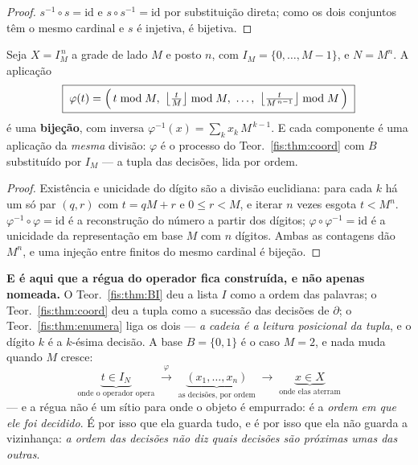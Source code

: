 \documentclass[livro.tex]{subfiles}
\begin{document}
\begin{proof}
$s^{-1}\circ s=\mathrm{id}$ e $s\circ s^{-1}=\mathrm{id}$ por substituição
direta; como os dois conjuntos têm o mesmo cardinal e $s$ é injetiva, é bijetiva.
\end{proof}

\begin{teorema}\label{fis:thm:enumera}
Seja $X=I_M^{\,n}$ a grade de lado $M$ e posto $n$, com $I_M=\{0,\dots,M-1\}$, e
$N=M^{n}$. A aplicação
\[
\boxed{\;\varphi(t)=\Bigl(\,t\bmod M,\ \bigl\lfloor\tfrac{t}{M}\bigr\rfloor\bmod M,\ \dots,\
\bigl\lfloor\tfrac{t}{M^{\,n-1}}\bigr\rfloor\bmod M\,\Bigr)\;}
\]
é uma \textbf{bijeção}, com inversa $\varphi^{-1}(x)=\sum_{k}x_k\,M^{\,k-1}$. E
cada componente é uma aplicação da \emph{mesma} divisão: $\varphi$ é o processo do
Teor.~\ref{fis:thm:coord} com $B$ substituído por $I_M$ --- a tupla das decisões,
lida por ordem.
\end{teorema}

\begin{proof}
Existência e unicidade do dígito são a divisão euclidiana: para cada $k$ há um só
par $(q,r)$ com $t=qM+r$ e $0\le r<M$, e iterar $n$ vezes esgota $t<M^{n}$.
$\varphi^{-1}\circ\varphi=\mathrm{id}$ é a reconstrução do número a partir dos
dígitos; $\varphi\circ\varphi^{-1}=\mathrm{id}$ é a unicidade da representação em
base $M$ com $n$ dígitos. Ambas as contagens dão $M^{n}$, e uma injeção entre
finitos do mesmo cardinal é bijeção.
\end{proof}

\medskip\noindent\textbf{E é aqui que a régua do operador fica construída, e não
apenas nomeada.} O Teor.~\ref{fis:thm:BI} deu a lista $I$ como a ordem das
palavras; o Teor.~\ref{fis:thm:coord} deu a tupla como a sucessão das decisões de
$\partial$; o Teor.~\ref{fis:thm:enumera} liga os dois --- \emph{a cadeia é a
leitura posicional da tupla}, e o dígito $k$ é a $k$-ésima decisão. A base
$B=\{0,1\}$ é o caso $M=2$, e nada muda quando $M$ cresce:
\[
\underbrace{t\in I_N}_{\text{onde o operador opera}}
\;\xrightarrow{\ \varphi\ }\;
\underbrace{(x_1,\dots,x_n)}_{\text{as decisões, por ordem}}
\;\longrightarrow\;
\underbrace{x\in X}_{\text{onde elas aterram}}
\]
--- e a régua não é um sítio para onde o objeto é empurrado: é a \emph{ordem em
que ele foi decidido}. É por isso que ela guarda tudo, e é por isso que ela não
guarda a vizinhança: \emph{a ordem das decisões não diz quais decisões são
próximas umas das outras}.
\end{document}
